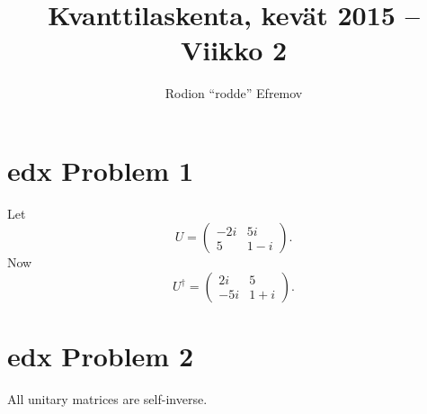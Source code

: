 \documentclass[10pt]{article}
\title{Kvanttilaskenta, kevät 2015 -- Viikko 2}
\author{Rodion ``rodde'' Efremov}
\begin{document}
 \maketitle

\section*{edx Problem 1}
Let 
\[
U =
\begin{pmatrix}
-2i & 5i \\
5 & 1 - i 
\end{pmatrix}.
\]
Now
\[
U^{\dag} = 
\begin{pmatrix}
2i & 5 \\
-5i & 1 + i
\end{pmatrix}.
\]

\section*{edx Problem 2}
All unitary matrices are self-inverse.
\end{document}
